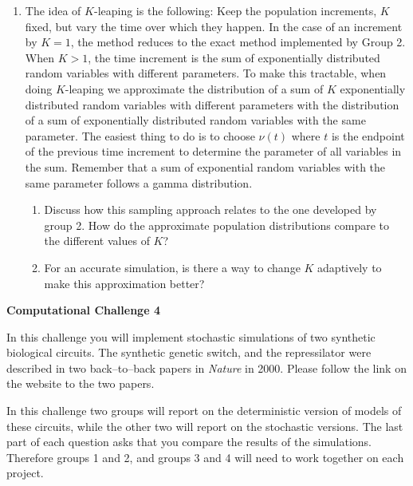 \documentclass[12pt]{article}
\begin{document}
\begin{enumerate}
\item[\bf Group 4] 	
	The idea of $K$-leaping is the following: Keep the population increments, $K$ fixed, but vary the time over which they happen. In the case of an increment by $K = 1$, the method reduces to the exact method implemented by Group 2. When $K > 1$, the time increment is the sum of exponentially distributed random variables with different parameters. To make this tractable, when doing $K$-leaping we approximate the distribution of a sum of $K$ exponentially distributed random variables with different parameters with the distribution of a sum of exponentially distributed random variables with the same parameter. The easiest thing to do is to choose $\nu(t)$ where $t$ is the endpoint of the previous time increment to determine the parameter of all variables in the sum. Remember that a sum of exponential random variables with the same parameter follows a gamma distribution.
	
\begin{enumerate}
	\item Discuss how this sampling approach relates to the one developed by group 2. How do the approximate population distributions compare to the different values of $K$?
	\item For an accurate simulation, is there a way to change $K$ adaptively to make this approximation better?	
\end{enumerate}
	
	
\end{enumerate}



\begin{center}
{\Large \bf Computational Challenge 4
\\ \vskip5mm }
\end{center}

In this challenge you will implement stochastic simulations of two synthetic biological circuits.
The synthetic genetic switch, and the repressilator were described in two back--to--back papers
in \emph{Nature} in 2000.  Please follow the link on the website to the two papers. 

In this challenge two groups will report on the deterministic version of models of these circuits, while the other two
will report on the stochastic versions. The last part of each question asks that you 
compare the results of the simulations. Therefore groups 1 and 2, and groups 3 and 4 will
need to work together on each project.
\end{document}
